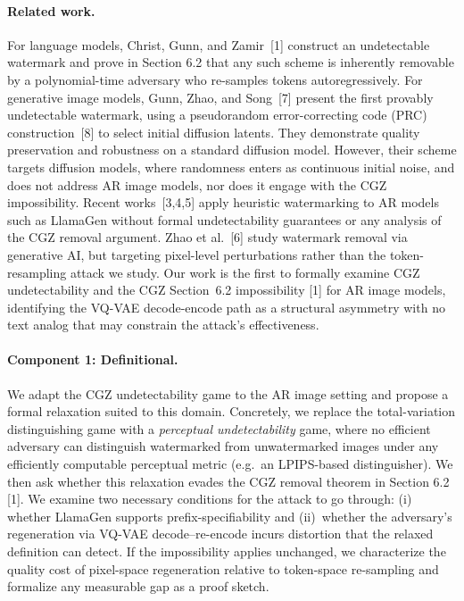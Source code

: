 \documentclass[10pt]{article}
\begin{document}
\paragraph{Related work.}
For language models, Christ, Gunn, and Zamir~[1] construct an undetectable watermark and prove in Section 6.2 that any such scheme is inherently removable
by a polynomial-time adversary who re-samples tokens autoregressively. For generative image models, Gunn, Zhao, and Song~[7] present the first provably
undetectable watermark, using a pseudorandom error-correcting code (PRC) construction~[8] to select initial diffusion latents. They demonstrate quality
preservation and robustness on a standard diffusion model. However, their scheme
targets diffusion models, where randomness enters as continuous initial
noise, and does not address AR image models, nor does it engage with the CGZ
impossibility. Recent works~[3,4,5] apply heuristic watermarking to AR models such as 
LlamaGen without formal undetectability guarantees or any analysis of 
the CGZ removal argument. Zhao et al.~[6] study watermark removal via generative AI, but targeting pixel-level perturbations rather than the token-resampling attack we study. Our work is the first to
formally examine CGZ undetectability and the CGZ Section~6.2 impossibility [1] for AR
image models, identifying the VQ-VAE decode-encode path as a structural asymmetry with no text analog that may constrain the attack's effectiveness.

\paragraph{Component 1: Definitional.}
We adapt the CGZ undetectability game to the AR image setting and
propose a formal relaxation suited to this domain. Concretely, we
replace the total-variation distinguishing game with a
\emph{perceptual undetectability} game, where no efficient adversary can
distinguish watermarked from unwatermarked images under any efficiently
computable perceptual metric (e.g.\ an LPIPS-based distinguisher). We then
ask whether this relaxation evades the CGZ removal theorem in Section 6.2 [1]. We
examine two necessary conditions for the attack to go through: (i)
whether LlamaGen supports prefix-specifiability and (ii)~whether
the adversary's regeneration via VQ-VAE decode--re-encode incurs
distortion that the relaxed definition can detect. If the impossibility
applies unchanged, we characterize the 
quality cost of pixel-space regeneration relative to token-space 
re-sampling and formalize any measurable gap as a proof sketch.
\end{document}
